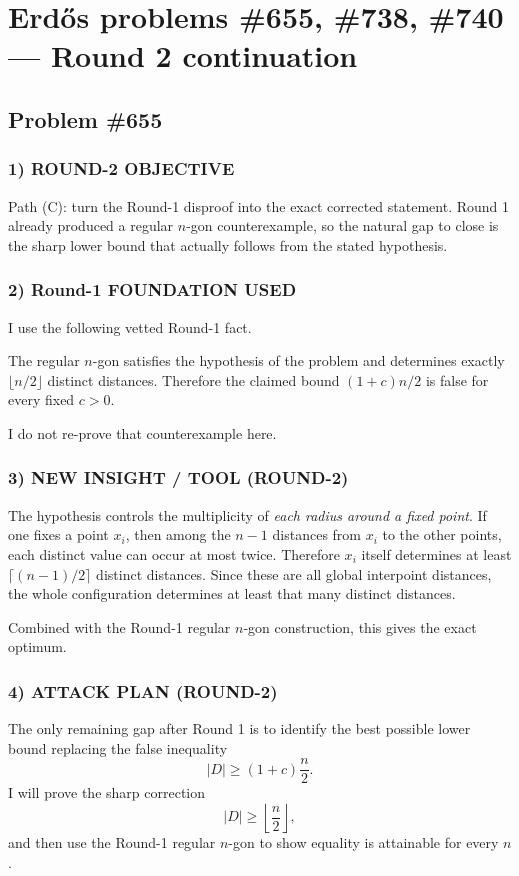 \section{Erd\H{o}s problems \#655, \#738, \#740 --- Round 2 continuation}

\subsection*{Problem \#655}

\subsubsection*{1) ROUND-2 OBJECTIVE}
Path (C): turn the Round-1 disproof into the exact corrected statement. Round 1 already produced a regular $n$-gon counterexample, so the natural gap to close is the sharp lower bound that actually follows from the stated hypothesis.

\subsubsection*{2) Round-1 FOUNDATION USED}
I use the following vetted Round-1 fact.

The regular $n$-gon satisfies the hypothesis of the problem and determines exactly $\lfloor n/2\rfloor$ distinct distances. Therefore the claimed bound $(1+c)n/2$ is false for every fixed $c>0$.

I do not re-prove that counterexample here.

\subsubsection*{3) NEW INSIGHT / TOOL (ROUND-2)}
The hypothesis controls the multiplicity of \emph{each radius around a fixed point}. If one fixes a point $x_i$, then among the $n-1$ distances from $x_i$ to the other points, each distinct value can occur at most twice. Therefore $x_i$ itself determines at least $\lceil (n-1)/2\rceil$ distinct distances. Since these are all global interpoint distances, the whole configuration determines at least that many distinct distances.

Combined with the Round-1 regular $n$-gon construction, this gives the exact optimum.

\subsubsection*{4) ATTACK PLAN (ROUND-2)}
The only remaining gap after Round 1 is to identify the best possible lower bound replacing the false inequality
\[
|D|\geq (1+c)\frac n2.
\]
I will prove the sharp correction
\[
|D|\geq \left\lfloor\frac n2\right\rfloor,
\]
and then use the Round-1 regular $n$-gon to show equality is attainable for every $n$.

